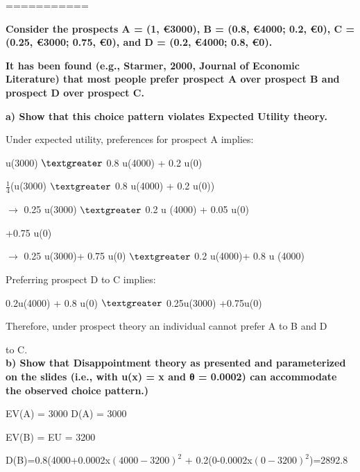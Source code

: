 \documentclass{article}
\begin{document}
===========

\textbf{Consider the prospects A = (1, €3000), B = (0.8, €4000; 0.2, €0), \linebreak C = (0.25, €3000; 0.75, €0), and D = (0.2, €4000; 0.8, €0). \linebreak}
	  
\textbf{It has been found (e.g., Starmer, 2000, Journal of Economic Literature) that most people prefer prospect A over prospect B and prospect D over prospect C.} 
	  
	 \vspace{2mm} 
	  
\textbf{ a) Show that this choice pattern violates Expected Utility theory.} 
 
  \vspace{2mm}
 
 Under expected utility, preferences for prospect A implies: 
 
 u(3000) $\textgreater$ 0.8 u(4000) + 0.2 u(0)
 
 $\frac{1}{4}$(u(3000) $\textgreater$ 0.8 u(4000) + 0.2 u(0))
  
 $\rightarrow$ 0.25 u(3000) $\textgreater$ 0.2 u (4000) + 0.05 u(0)
    
			    +0.75 u(0)
    
 $\rightarrow$ 0.25 u(3000)+ 0.75 u(0) $\textgreater$ 0.2 u(4000)+ 0.8 u (4000)
 
 \vspace{2mm}
 
 Preferring prospect D to C implies: 
 
 0.2u(4000) + 0.8 u(0) $\textgreater$ 0.25u(3000) +0.75u(0)
  
   \vspace{2mm}
  
 Therefore, under prospect theory an individual cannot prefer A to B and D 
 
 to C. \\
 
\textbf{ b) Show that Disappointment theory as presented and parameterized on the slides
(i.e., with u(x) = x and θ = 0.0002) can accommodate the observed choice pattern.)} 
  
  \vspace{2mm}
  
  EV(A) = 3000		D(A) = 3000		
  
  EV(B) = EU = 3200
  
  D(B)=0.8(4000+0.0002x$(4000-3200)^2$ + 0.2(0-0.0002x$(0-3200)^2$)=2892.8
  
\end{document}
